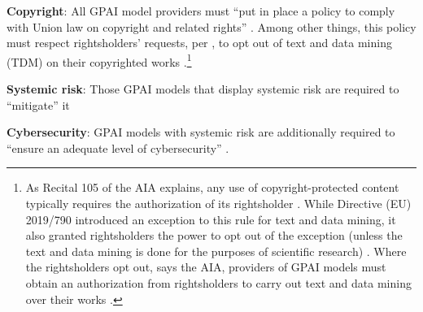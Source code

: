 \textbf{Copyright}: 
All GPAI model providers must ``put in place a policy to comply with Union law on copyright and related rights'' \citep[Art. 53.c]{european_union_ai_act_2024}. Among other things, this policy must respect rightsholders' requests, per \citep[Art. 4(3)]{eu_dsg_directive_2019}, to opt out of text and data mining (TDM) on their copyrighted works \citep[Rec. 105, Art. 53.c]{european_union_ai_act_2024}.\footnote{As Recital 105 of the AIA explains, any use of copyright-protected content typically requires the authorization of its rightsholder \citep[Rec. 105]{european_union_ai_act_2024}. While Directive (EU) 2019/790 introduced an exception to this rule for text and data mining, it also granted rightsholders the power to opt out of the exception (unless the text and data mining is done for the purposes of scientific research) \citep[Art. 4]{eu_dsg_directive_2019}. Where the rightsholders opt out, says the AIA, providers of GPAI models must obtain an authorization from rightsholders to carry out text and data mining over their works \citep[Rec. 105]{european_union_ai_act_2024}.}

\textbf{Systemic risk}:
Those GPAI models that display systemic risk are required to ``mitigate'' it \citep[Art. 55(a-b)]{european_union_ai_act_2024}

\textbf{Cybersecurity}: 
GPAI models with systemic risk are additionally required to ``ensure an adequate level of cybersecurity'' \citep[Art. 55(d)]{european_union_ai_act_2024}.



%
